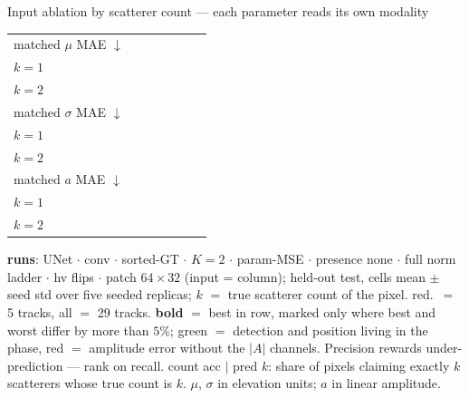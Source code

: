 \begin{frame}{Input ablation by scatterer count --- each parameter reads its own modality}
\begin{tabular}{@{}l cc cc !{\hspace{3pt}} cc@{}}
    \addlinespace
    matched $\mu$ MAE $\downarrow$ &  &  &  &  &  &  \\
    \quad $k{=}1$                &  &  &  &  &  &  \\
    \addlinespace[2pt]
    \quad $k{=}2$                &  &  &  &  &  &  \\
    \addlinespace
    matched $\sigma$ MAE $\downarrow$ &  &  &  &  &  &  \\
    \quad $k{=}1$                &  &  &  &  &  &  \\
    \quad $k{=}2$                &  &  &  &  &  &  \\
    \addlinespace
    matched $a$ MAE $\downarrow$ &  &  &  &  &  &  \\
    \quad $k{=}1$                &  &  &  &  &  &  \\
    \quad $k{=}2$                &  &  &  &  &  &  \\
    \bottomrule
  \end{tabular}
  \par\vspace{3pt}
  \parbox{0.82\textwidth}{\tiny\color{soft} \textbf{runs}: UNet $\cdot$ conv $\cdot$ sorted-GT $\cdot$ $K{=}2$ $\cdot$ param-MSE $\cdot$ presence none $\cdot$ full norm ladder $\cdot$ hv flips $\cdot$ patch $64{\times}32$ (input = column); held-out test, cells mean $\pm$ seed std over five seeded replicas; $k$ $=$ true scatterer count of the pixel. red.\ $=$ 5 tracks, all $=$ 29 tracks. \textbf{bold} $=$ best in row, marked only where best and worst differ by more than $5\%$; \textcolor{good}{green} $=$ detection and position living in the phase, \textcolor{accent}{red} $=$ amplitude error without the $|A|$ channels. Precision rewards under-prediction --- rank on recall. count acc $\mid$ pred $k$: share of pixels claiming exactly $k$ scatterers whose true count is $k$. $\mu$, $\sigma$ in elevation units; $a$ in linear amplitude.\par}
    


\end{frame}
